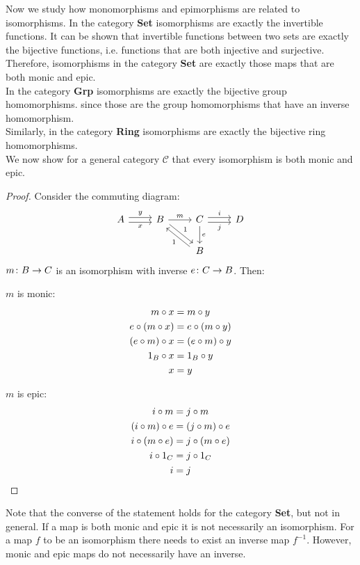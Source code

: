 Now we study how monomorphisms and epimorphisms are related to isomorphisms.
In the category \textbf{Set} isomorphisms are exactly the invertible functions.
It can be shown that invertible functions between two sets are
exactly the bijective functions, i.e. functions that are both injective and surjective.
Therefore, isomorphisms in the category \textbf{Set} are exactly those maps that are both monic and epic.\\
In the category \textbf{Grp} isomorphisms are exactly the bijective group homomorphisms.
since those are the group homomorphisms that have an inverse homomorphism.\\
Similarly, in the category \textbf{Ring} isomorphisms are exactly the bijective ring homomorphisms.\\
We now show for a general category $\mathscr{C}$ that every isomorphism is both monic and epic.
\begin{proof}
  Consider the commuting diagram:
  \[
    \begin{tikzcd}
      A \arrow[r,shift left, "y"] \arrow[r,shift right,swap,"x"] &
      B \arrow[dr, shift left, "1"]  \arrow{r}{m}  &
      C \arrow{d}{e} \arrow[r,shift left, "i"] \arrow[r,shift right,swap,"j"] & D\\
      &  & B \arrow[ul, shift left, "1"]&
    \end{tikzcd}
  \]
  $m \from B \to C$ is an isomorphism with inverse $e \from C \to B$.
  Then:\\
  \begin{minipage}{.5\linewidth}
    \vspace{4mm}
    \centering $m$ is monic:
    \[
      \begin{aligned}
        m \mathbin{\circ} x &= m \mathbin{\circ} y\\
        e \mathbin{\circ} (m \mathbin{\circ} x) &= e \mathbin{\circ} (m \mathbin{\circ} y)\\
        (e \mathbin{\circ} m) \mathbin{\circ} x &= (e \mathbin{\circ} m) \mathbin{\circ} y\\
        1_B \mathbin{\circ} x &= 1_B \mathbin{\circ} y\\
        x &= y
      \end{aligned}
    \]
  \end{minipage}%
  \begin{minipage}{.5\linewidth}
    \vspace{4mm}
    \centering $m$ is epic:
    \[
      \begin{aligned}
        i \mathbin{\circ} m &= j \mathbin{\circ} m \\
        (i \mathbin{\circ} m) \mathbin{\circ} e &= (j \mathbin{\circ} m) \mathbin{\circ} e\\
        i \mathbin{\circ} (m \mathbin{\circ} e) &= j \mathbin{\circ} (m \mathbin{\circ} e)\\
        i \mathbin{\circ} 1_C &= j \mathbin{\circ} 1_C\\
        i &= j
      \end{aligned}
    \]
  \end{minipage}%
\end{proof}
Note that the converse of the statement holds for the category \textbf{Set}, but not in general.
If a map is both monic and epic it is not necessarily an isomorphism.
For a map $f$ to be an isomorphism there needs to exist an inverse map $f^{-1}$.
However, monic and epic maps do not necessarily have an inverse.\\

